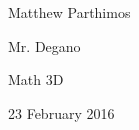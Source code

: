 \documentclass[12pt]{article}
\begin{document}
\begin{flushleft}
Matthew Parthimos 

Mr. Degano

Math 3D

23 February 2016

\end{flushleft}
\end{document}
